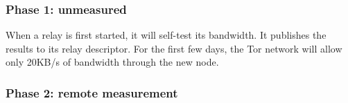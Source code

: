 \documentclass[12pt,journal]{IEEEtran}
\begin{document}
\subsubsection{Phase 1: unmeasured}
When a relay is first started, it will self-test its bandwidth. It publishes the results to its relay descriptor. For the first few days, the Tor network will allow only 20KB/s of bandwidth through the new node.
\subsubsection{Phase 2: remote measurement}

\printbibliography
\end{document}
